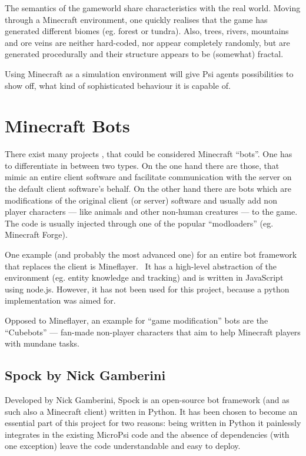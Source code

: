 The semantics of the gameworld share characteristics with the real world. Moving through a Minecraft environment, one quickly realises that the game has generated different biomes (eg. forest or tundra). Also, trees, rivers, mountains and ore veins are neither hard-coded, nor appear completely randomly, but are generated procedurally and their structure appears to be (somewhat) fractal.
        
Using Minecraft as a simulation environment will give Psi agents possibilities to show off, what kind of sophisticated behaviour it is capable of.

    \section{Minecraft Bots}
There exist many projects , that could be considered Minecraft ``bots''. One has to differentiate in between two types. On the one hand there are those, that mimic an entire client software and facilitate communication with the server on the default client software's behalf. On the other hand there are bots which are modifications of the original client (or server) software and usually add non player characters --- like animals and other non-human creatures --- to the game. The code is usually injected through one of the popular ``modloaders'' (eg. Minecraft Forge).

One example (and probably the most advanced one) for an entire bot framework that replaces the client is Mineflayer.~\cite{github_mineflayer} It has a high-level abstraction of the environment (eg. entity knowledge and tracking) and is written in JavaScript using node.js. However, it has not been used for this project, because a python implementation was aimed for.

Opposed to Mineflayer, an example for ``game modification'' bots are the ``Cubebots'' --- fan-made non-player characters that aim to help Minecraft players with mundane tasks.\cite{mcforums_cubebots}

    \subsection{Spock by Nick Gamberini}
Developed by Nick Gamberini, Spock is an open-source bot framework (and as such also a Minecraft client) written in Python. It has been chosen to become an essential part of this project for two reasons: being written in Python it painlessly integrates in the existing MicroPsi code and the absence of dependencies (with one exception) leave the code understandable and easy to deploy.
    
